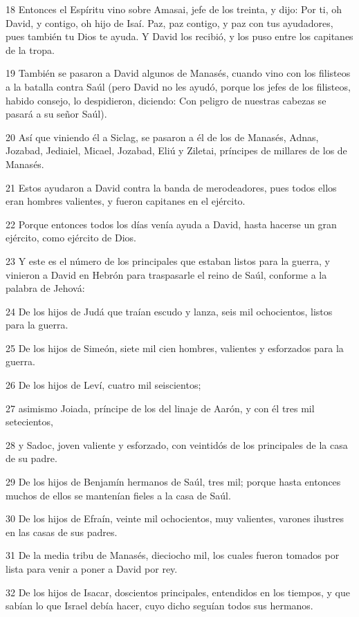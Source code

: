 \par 18 Entonces el Espíritu vino sobre Amasai, jefe de los treinta, y dijo: Por ti, oh David, y contigo, oh hijo de Isaí. Paz, paz contigo, y paz con tus ayudadores, pues también tu Dios te ayuda. Y David los recibió, y los puso entre los capitanes de la tropa.
\par 19 También se pasaron a David algunos de Manasés, cuando vino con los filisteos a la batalla contra Saúl (pero David no les ayudó, porque los jefes de los filisteos, habido consejo, lo despidieron, diciendo: Con peligro de nuestras cabezas se pasará a su señor Saúl).
\par 20 Así que viniendo él a Siclag, se pasaron a él de los de Manasés, Adnas, Jozabad, Jediaiel, Micael, Jozabad, Eliú y Ziletai, príncipes de millares de los de Manasés.
\par 21 Estos ayudaron a David contra la banda de merodeadores, pues todos ellos eran hombres valientes, y fueron capitanes en el ejército.
\par 22 Porque entonces todos los días venía ayuda a David, hasta hacerse un gran ejército, como ejército de Dios.
\par 23 Y este es el número de los principales que estaban listos para la guerra, y vinieron a David en Hebrón para traspasarle el reino de Saúl, conforme a la palabra de Jehová:
\par 24 De los hijos de Judá que traían escudo y lanza, seis mil ochocientos, listos para la guerra.
\par 25 De los hijos de Simeón, siete mil cien hombres, valientes y esforzados para la guerra.
\par 26 De los hijos de Leví, cuatro mil seiscientos;
\par 27 asimismo Joiada, príncipe de los del linaje de Aarón, y con él tres mil setecientos,
\par 28 y Sadoc, joven valiente y esforzado, con veintidós de los principales de la casa de su padre.
\par 29 De los hijos de Benjamín hermanos de Saúl, tres mil; porque hasta entonces muchos de ellos se mantenían fieles a la casa de Saúl.
\par 30 De los hijos de Efraín, veinte mil ochocientos, muy valientes, varones ilustres en las casas de sus padres.
\par 31 De la media tribu de Manasés, dieciocho mil, los cuales fueron tomados por lista para venir a poner a David por rey.
\par 32 De los hijos de Isacar, doscientos principales, entendidos en los tiempos, y que sabían lo que Israel debía hacer, cuyo dicho seguían todos sus hermanos.
